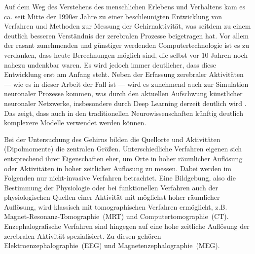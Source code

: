 \documentclass[doc,a4paper,12pt]{apa6}
\begin{document}
Auf dem Weg des Verstehens des menschlichen Erlebens und Verhaltens kam es ca. seit Mitte der 1990er Jahre zu einer beschleunigten Entwicklung von Verfahren und Methoden zur Messung der Gehirnaktivität, was seitdem zu einem deutlich besseren Verständnis der zerebralen Prozesse beigetragen hat. Vor allem der rasant zunehmenden und günstiger werdenden Computertechnologie ist es zu verdanken, dass heute Berechnungen möglich sind, die selbst vor 10 Jahren noch nahezu undenkbar waren. Es wird jedoch immer deutlicher, dass diese Entwicklung erst am Anfang steht. Neben der Erfassung zerebraler Aktivitäten --- wie es in dieser Arbeit der Fall ist --- wird es zunehmend auch zur Simulation neuronaler Prozesse kommen, was durch den aktuellen Aufschwung künstlicher neuronaler Netzwerke, insbesondere durch Deep Learning derzeit deutlich wird \parencite[z.B.][]{ciresan2012multi}. Das zeigt, dass auch in den traditionellen Neurowissenschaften künftig deutlich komplexere Modelle verwendet werden können.

Bei der Untersuchung des Gehirns bilden die Quellorte und Aktivitäten (Dipolmomente) die zentralen Größen. Unterschiedliche Verfahren eigenen sich entsprechend ihrer Eigenschaften eher, um Orte in hoher räumlicher Auflösung oder Aktivitäten in hoher zeitlicher Auflösung zu messen. Dabei werden im Folgenden nur nicht-invasive Verfahren betrachtet. Eine Bildgebung, also die Bestimmung der Physiologie oder bei funktionellen Verfahren auch der physiologischen Quellen einer Aktivität mit möglichst hoher räumlicher Auflösung, wird klassisch mit tomographischen Verfahren ermöglicht, z.B. Magnet-Resonanz-Tomographie~(MRT) und Computertomographie~(CT). Enzephalografische Verfahren sind hingegen auf eine hohe zeitliche Auflösung der zerebralen Aktivität spezialisiert. Zu diesen gehören Elektroenzephalographie~(EEG) und Magnetenzephalographie~(MEG).
\end{document}
